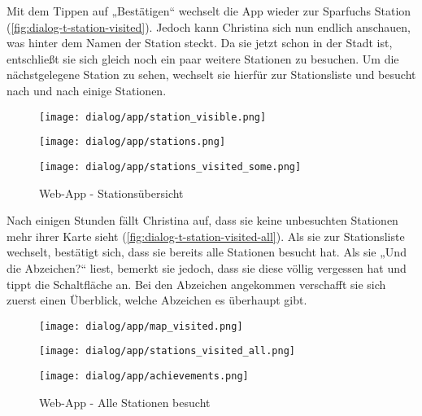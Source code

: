 Mit dem Tippen auf „Bestätigen“ wechselt die App wieder zur Sparfuchs Station
(\autoref{fig:dialog-t-station-visited}). Jedoch kann Christina sich nun
endlich anschauen, was hinter dem Namen der Station steckt. Da sie jetzt schon
in der Stadt ist, entschließt sie sich gleich noch ein paar weitere Stationen zu
besuchen. Um die nächstgelegene Station zu sehen, wechselt sie hierfür zur
Stationsliste und besucht nach und nach einige Stationen.

\begin{figure}[htpb]
    \centering
    \begin{minipage}{.325\textwidth}
        \centering
        \texttt{[image: dialog/app/station\_visible.png]}
    \end{minipage}%
    \begin{minipage}{.325\textwidth}
        \centering
        \texttt{[image: dialog/app/stations.png]}
    \end{minipage}
    \begin{minipage}{.325\textwidth}
        \centering
        \texttt{[image: dialog/app/stations\_visited\_some.png]}
    \end{minipage}
    \caption{Web-App - Stationsübersicht}
    \label{fig:dialog-t-station-visited}
\end{figure}

Nach einigen Stunden fällt Christina auf, dass sie keine unbesuchten Stationen
mehr ihrer Karte sieht (\autoref{fig:dialog-t-station-visited-all}). Als sie
zur Stationsliste wechselt, bestätigt sich, dass sie bereits alle Stationen
besucht hat. Als sie „Und die Abzeichen?“ liest, bemerkt sie jedoch, dass sie
diese völlig vergessen hat und tippt die Schaltfläche an. Bei den Abzeichen
angekommen verschafft sie sich zuerst einen Überblick, welche Abzeichen es
überhaupt gibt.

\begin{figure}[htpb]
    \centering
    \begin{minipage}{.325\textwidth}
        \centering
        \texttt{[image: dialog/app/map\_visited.png]}
    \end{minipage}%
    \begin{minipage}{.325\textwidth}
        \centering
        \texttt{[image: dialog/app/stations\_visited\_all.png]}
    \end{minipage}
    \begin{minipage}{.325\textwidth}
        \centering
        \texttt{[image: dialog/app/achievements.png]}
    \end{minipage}
    \caption{Web-App - Alle Stationen besucht}
    \label{fig:dialog-t-station-visited-all}
\end{figure}

